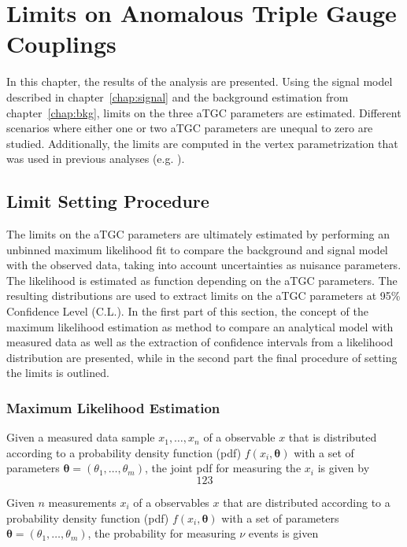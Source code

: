 \chapter{Limits on Anomalous Triple Gauge Couplings}
\label{chap:LimitsonATGCs}

In this chapter, the results of the analysis are presented. Using the signal model described in chapter~\ref{chap:signal} and the background estimation from chapter~\ref{chap:bkg}, limits on the three aTGC parameters are estimated. Different scenarios where either one or two aTGC parameters are unequal to zero are studied. Additionally, the limits are computed in the vertex parametrization that was used in previous analyses (e.g. \cite{aTGC1,aTGC2}).

\section{Limit Setting Procedure}
The limits on the aTGC parameters are ultimately estimated by performing an unbinned maximum likelihood fit to compare the background and signal model with the observed data, taking into account uncertainties as nuisance parameters. The likelihood is estimated as function depending on the aTGC parameters. The resulting distributions are used to extract limits on the aTGC parameters at 95\% Confidence Level (C.L.). In the first part of this section, the concept of the maximum likelihood estimation as method to compare an analytical model with measured data as well as the extraction of confidence intervals from a likelihood distribution are presented, while in the second part the final procedure of setting the limits is outlined.
\subsection{Maximum Likelihood Estimation}
\label{subsec:maxlikeest}
Given a measured data sample $x_1,\dots,x_n$ of a observable $x$ that is distributed according to a probability density function (pdf) $f(x_i,\boldsymbol{\theta})$ with a set of parameters $\boldsymbol{\theta}=(\theta_1,\dots,\theta_m)$, the joint pdf for measuring the $x_i$ is given by
\begin{equation}
123
\end{equation}

Given $n$ measurements $x_i$ of a observables $x$ that are distributed according to a probability density function (pdf) $f(x_i,\boldsymbol{\theta})$ with a set of parameters $\boldsymbol{\theta}=(\theta_1,\dots,\theta_m)$, the probability for measuring $\nu$ events is given 


